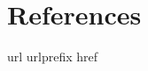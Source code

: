 \documentclass[preprint,12pt]{elsarticle}
\begin{document}


%


\section*{References}\label{sec:ref}




 
%
\begin{thebibliography}{1}
\expandafter\ifx\csname url\endcsname\relax
  \def\url#1{\texttt{#1}}\fi
\expandafter\ifx\csname urlprefix\endcsname\relax\def\urlprefix{URL }\fi
\expandafter\ifx\csname href\endcsname\relax
  \def\href#1#2{#2} \def\path#1{#1}\fi

\end{thebibliography}
\end{document}
